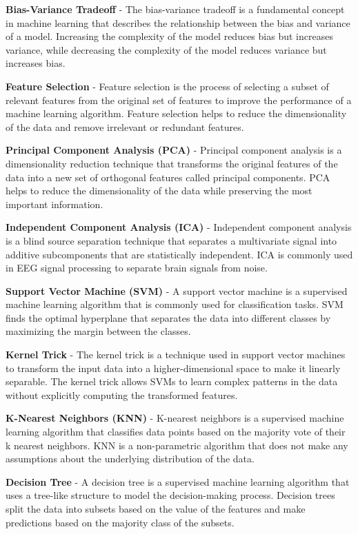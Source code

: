 \textbf{Bias-Variance Tradeoff} - The bias-variance tradeoff is a fundamental concept in machine learning that describes the relationship between the bias and variance of a model. Increasing the complexity of the model reduces bias but increases variance, while decreasing the complexity of the model reduces variance but increases bias.

\textbf{Feature Selection} - Feature selection is the process of selecting a subset of relevant features from the original set of features to improve the performance of a machine learning algorithm. Feature selection helps to reduce the dimensionality of the data and remove irrelevant or redundant features.

\textbf{Principal Component Analysis (PCA)} - Principal component analysis is a dimensionality reduction technique that transforms the original features of the data into a new set of orthogonal features called principal components. PCA helps to reduce the dimensionality of the data while preserving the most important information.

\textbf{Independent Component Analysis (ICA)} - Independent component analysis is a blind source separation technique that separates a multivariate signal into additive subcomponents that are statistically independent. ICA is commonly used in EEG signal processing to separate brain signals from noise.

\textbf{Support Vector Machine (SVM)} - A support vector machine is a supervised machine learning algorithm that is commonly used for classification tasks. SVM finds the optimal hyperplane that separates the data into different classes by maximizing the margin between the classes.

\textbf{Kernel Trick} - The kernel trick is a technique used in support vector machines to transform the input data into a higher-dimensional space to make it linearly separable. The kernel trick allows SVMs to learn complex patterns in the data without explicitly computing the transformed features.

\textbf{K-Nearest Neighbors (KNN)} - K-nearest neighbors is a supervised machine learning algorithm that classifies data points based on the majority vote of their k nearest neighbors. KNN is a non-parametric algorithm that does not make any assumptions about the underlying distribution of the data.

\textbf{Decision Tree} - A decision tree is a supervised machine learning algorithm that uses a tree-like structure to model the decision-making process. Decision trees split the data into subsets based on the value of the features and make predictions based on the majority class of the subsets.

